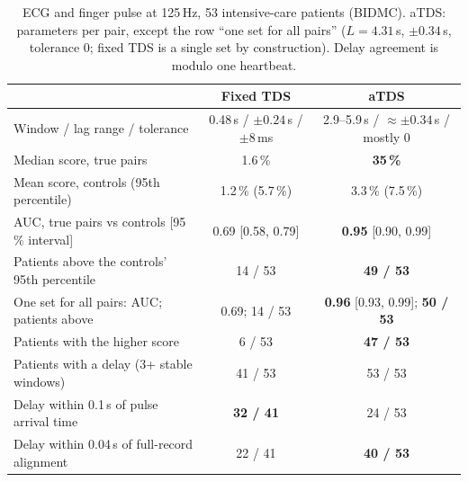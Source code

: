 \documentclass[11pt,a4paper]{article}
\begin{document}
\begin{table}[!htbp]
\centering
\caption{ECG and finger pulse at 125\,Hz, 53 intensive-care patients (BIDMC). aTDS: parameters per pair, except the row ``one set for all pairs'' ($L = 4.31$\,s, $\pm0.34$\,s, tolerance 0; fixed TDS is a single set by construction). Delay agreement is modulo one heartbeat.}
\label{tab:bidmcpair}
\footnotesize
\begin{tabular}{lcc}
\toprule
 & Fixed TDS & aTDS \\
\midrule
Window / lag range / tolerance & 0.48\,s / $\pm0.24$\,s / $\pm8$\,ms & 2.9--5.9\,s / $\approx\pm0.34$\,s / mostly 0 \\
Median score, true pairs & 1.6\,\% & \textbf{35\,\%} \\
Mean score, controls (95th percentile) & 1.2\,\% (5.7\,\%) & 3.3\,\% (7.5\,\%) \\
AUC, true pairs vs controls [95\,\% interval] & 0.69 [0.58, 0.79] & \textbf{0.95} [0.90, 0.99] \\
Patients above the controls' 95th percentile & 14 / 53 & \textbf{49 / 53} \\
One set for all pairs: AUC; patients above & 0.69; 14 / 53 & \textbf{0.96} [0.93, 0.99]; \textbf{50 / 53} \\
Patients with the higher score & 6 / 53 & \textbf{47 / 53} \\
Patients with a delay (3+ stable windows) & 41 / 53 & 53 / 53 \\
Delay within 0.1\,s of pulse arrival time & \textbf{32 / 41} & 24 / 53 \\
Delay within 0.04\,s of full-record alignment & 22 / 41 & \textbf{40 / 53} \\
\bottomrule
\end{tabular}
\end{table}
\end{document}
